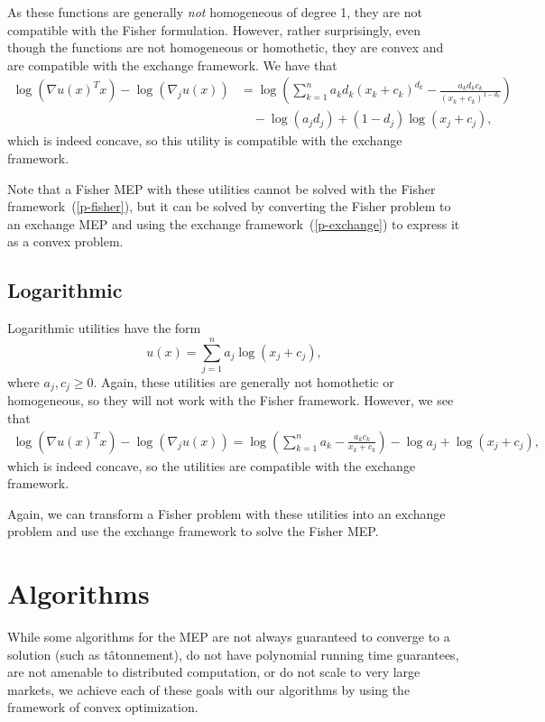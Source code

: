 \documentclass[12pt]{article}
\newcommand{\tatonnement}{t\^atonnement}
\begin{document}
As these functions are generally \emph{not} homogeneous of degree 1,
they are not compatible with the Fisher formulation.
However, rather surprisingly, even though the
functions are not homogeneous or homothetic, they are
convex and are compatible with the exchange framework.
We have that
\begin{align*}
\log(\nabla u(x)^T x) - \log(\nabla_j u(x))
&= \log\left(\sum_{k=1}^n a_k d_k (x_k+c_k)^{d_k} - \frac{a_k d_k c_k}{(x_k + c_k)^{1-d_k}} \right)\\
&\quad- \log(a_j d_j) + (1-d_j)\log (x_j + c_j),
\end{align*}
which is indeed concave, so this utility is compatible with
the exchange framework.

Note that a Fisher MEP with these utilities cannot be solved with the Fisher
framework~(\ref{p-fisher}), but it can be solved by converting the Fisher
problem to an exchange MEP and using the exchange framework~(\ref{p-exchange})
to express it as a convex problem.


\subsection{Logarithmic}
Logarithmic utilities have the form
\[
u(x) = \sum_{j=1}^n a_j \log(x_j+ c_j),
\]
where $a_j, c_j \geq 0$.
Again, these utilities are generally not homothetic or
homogeneous, so they will not work with the Fisher framework.
However, we see that 
\begin{align*}
\log(\nabla u(x)^T x) - \log(\nabla_j u(x)) =
\log\left(\sum_{k=1}^n a_k - \frac{a_k c_k}{x_k+c_k} \right) - \log a_j + \log (x_j + c_j),
\end{align*}
which is indeed concave, so the utilities are compatible
with the exchange framework.

Again, we can transform a Fisher problem with these utilities into
an exchange problem and use the exchange framework to solve
the Fisher MEP.

\section{Algorithms}
\label{sec:algorithms}

While some algorithms for the MEP are not always guaranteed to converge to a solution
(such as \tatonnement), do not have polynomial running time guarantees,
are not amenable to distributed computation, or do not scale to very large markets,
we achieve each of these goals with our algorithms by using the framework
of convex optimization.
\end{document}
